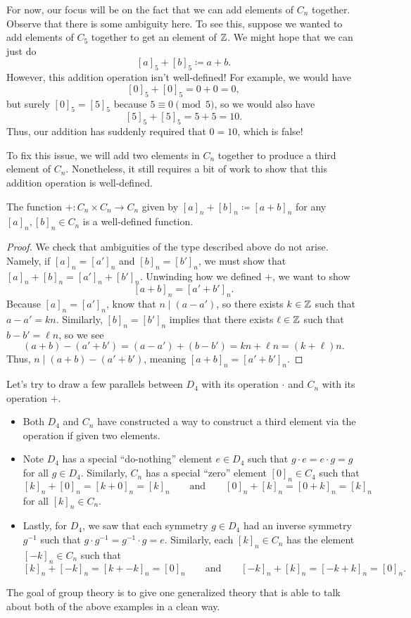 \documentclass[../notes.tex]{subfiles}
\begin{document}
For now, our focus will be on the fact that we can add elements of $C_n$ together. Observe that there is some ambiguity here. To see this, suppose we wanted to add elements of $C_5$ together to get an element of $\mathbb Z$. We might hope that we can just do
\[[a]_5+[b]_5\coloneqq a+b.\]
However, this addition operation isn't well-defined! For example, we would have
\[[0]_5+[0]_5=0+0=0,\]
but surely $[0]_5=[5]_5$ because $5\equiv0\pmod5$, so we would also have
\[[5]_5+[5]_5=5+5=10.\]
Thus, our addition has suddenly required that $0=10$, which is false!

To fix this issue, we will add two elements in $C_n$ together to produce a third element of $C_n$. Nonetheless, it still requires a bit of work to show that this addition operation is well-defined.
\begin{lemma}
    The function $+\colon C_n\times C_n\to C_n$ given by $[a]_n+[b]_n\coloneqq[a+b]_n$ for any $[a]_n,[b]_n\in C_n$ is a well-defined function.
\end{lemma}
\begin{proof}
    We check that ambiguities of the type described above do not arise. Namely, if $[a]_n=[a']_n$ and $[b]_n=[b']_n$, we must show that $[a]_n+[b]_n=[a']_n+[b']_n$. Unwinding how we defined $+$, we want to show
    \[[a+b]_n=[a'+b']_n.\]
    Because $[a]_n=[a']_n$, know that $n\mid(a-a')$, so there exists $k\in\mathbb Z$ such that $a-a'=kn$. Similarly, $[b]_n=[b']_n$ implies that there exists $\ell\in\mathbb Z$ such that $b-b'=\ell n$, so we see
    \[(a+b)-(a'+b')=(a-a')+(b-b')=kn+\ell n=(k+\ell)n.\]
    Thus, $n\mid(a+b)-(a'+b')$, meaning $[a+b]_n=[a'+b']_n$.
\end{proof}
Let's try to draw a few parallels between $D_4$ with its operation $\cdot$ and $C_n$ with its operation $+$.
\begin{itemize}
    \item Both $D_4$ and $C_n$ have constructed a way to construct a third element via the operation if given two elements.
    \item Note $D_4$ has a special ``do-nothing'' element $e\in D_4$ such that $g\cdot e=e\cdot g=g$ for all $g\in D_4$. Similarly, $C_n$ has a special ``zero'' element $[0]_n\in C_4$ such that
    \[[k]_n+[0]_n=[k+0]_n=[k]_n\qquad\text{and}\qquad[0]_n+[k]_n=[0+k]_n=[k]_n\]
    for all $[k]_n\in C_n$.
    \item Lastly, for $D_4$, we saw that each symmetry $g\in D_4$ had an inverse symmetry $g^{-1}$ such that $g\cdot g^{-1}=g^{-1}\cdot g=e$. Similarly, each $[k]_n\in C_n$ has the element $[-k]_n\in C_n$ such that
    \[[k]_n+[-k]_n=[k+-k]_n=[0]_n\qquad\text{and}\qquad[-k]_n+[k]_n=[-k+k]_n=[0]_n.\]
\end{itemize}
The goal of group theory is to give one generalized theory that is able to talk about both of the above examples in a clean way.
\end{document}
